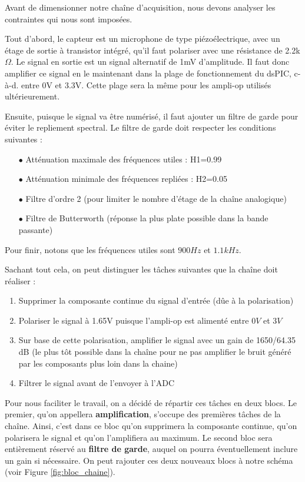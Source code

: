 Avant de dimensionner notre chaîne d'acquisition, nous devons analyser les contraintes qui nous sont imposées.


Tout d'abord, le capteur est un microphone de type piézoélectrique, avec un étage de sortie à transistor intégré, qu'il faut polariser avec une résistance de 2.2k$\Omega$. Le signal en sortie est un signal alternatif de 1mV d'amplitude. Il faut donc amplifier ce signal en le maintenant dans la plage de fonctionnement du dsPIC, c-à-d. entre 0V et 3.3V. Cette plage sera la même pour les ampli-op utilisés ultérieurement.

Ensuite, puisque le signal va être numérisé, il faut ajouter un filtre de garde pour éviter le repliement spectral. Le filtre de garde doit respecter les conditions suivantes : 

\begin{enumerate}
    \item[$\bullet$] Atténuation maximale des fréquences utiles : H1=0.99
    \item[$\bullet$] Atténuation minimale des fréquences repliées : H2=0.05
    \item[$\bullet$] Filtre d'ordre 2 (pour limiter le nombre d'étage de la chaîne analogique)
    \item[$\bullet$] Filtre de Butterworth (réponse la plus plate possible dans la bande passante)
\end{enumerate}

Pour finir, notons que les fréquences utiles sont $900 Hz$ et $1.1 kHz$.

Sachant tout cela, on peut distinguer les tâches suivantes que la chaîne doit réaliser :
\begin{enumerate}
    \item Supprimer la composante continue du signal d'entrée (dûe à la polarisation)
    \item Polariser le signal à 1.65V puisque l'ampli-op est alimenté entre $0V$ et $3V$
    \item Sur base de cette polarisation, amplifier le signal avec un gain de 1650/64.35 dB (le plus tôt possible dans la chaîne pour ne pas amplifier le bruit généré par les composants plus loin dans la chaine)
    \item  Filtrer le signal avant de l'envoyer à l'ADC
\end{enumerate}

Pour nous faciliter le travail, on a décidé de répartir ces tâches en deux blocs. Le premier, qu'on appellera \textbf{amplification}, s'occupe des premières tâches de la chaîne. Ainsi, c'est dans ce bloc qu'on supprimera la composante continue, qu'on polarisera le signal et qu'on l'amplifiera au maximum. Le second bloc sera entièrement réservé au \textbf{filtre de garde}, auquel on pourra éventuellement inclure un gain si nécessaire. On peut rajouter ces deux nouveaux blocs à notre schéma (voir Figure \ref{fig:bloc_chaine}).

